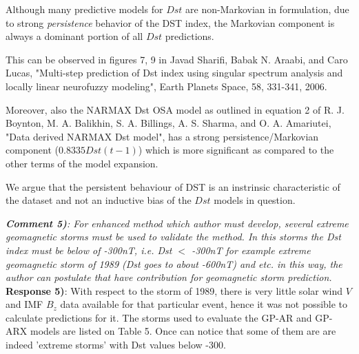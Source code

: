 \documentclass{article}
\begin{document}
Although many predictive models for $Dst$ are non-Markovian in formulation, due to strong \emph{persistence} behavior of the DST index, the Markovian component is always a dominant portion of all $Dst$ predictions. 

This can be observed in figures 7, 9 in Javad Sharifi, Babak N. Araabi, and Caro Lucas, "Multi-step prediction of Dst index using singular spectrum analysis and locally linear neurofuzzy modeling", Earth Planets Space, 58, 331-341, 2006. 

Moreover, also the NARMAX Dst OSA model as outlined in equation 2 of R. J. Boynton, M. A. Balikhin, S. A. Billings, A. S. Sharma, and O. A. Amariutei, "Data derived NARMAX Dst model", has a strong persistence/Markovian component ($0.8335 Dst(t-1)$) which is more significant as compared to the other terms of the model expansion.

We argue that the persistent behaviour of DST is an instrinsic characteristic of the dataset and not an inductive bias of the $Dst$ models in question.


\textit{
\textbf{Comment 5)}: For enhanced method which author must develop, several extreme geomagnetic storms must be used to validate the method. In this storms the Dst index must be below of -300nT, i.e. Dst $<$ -300nT for example extreme geomagnetic storm of 1989 (Dst goes to about -600nT) and etc. in this way, the author can postulate that have contribution for geomagnetic storm prediction.}\\

\textbf{Response 5)}: With respect to the storm of 1989, there is very little solar wind $V$ and IMF $B_z$ data available for that particular event, hence it was not possible to calculate predictions for it. 
The storms used to evaluate the GP-AR and GP-ARX models are listed on Table 5. Once can notice that some of them are are indeed 'extreme storms' with Dst values below -300. 
\end{document}
